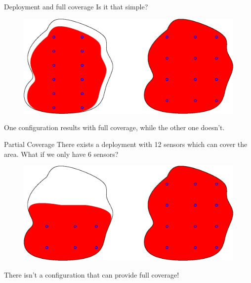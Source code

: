 \documentclass[t]{beamer}
\begin{document}
\begin{frame}[label=motivation7]{Deployment and full coverage}
Is it that simple?

\begin{figure}[b]
\includegraphics[scale=0.5]{motivation/deployment-configuration-partial-full-example.eps}
\end{figure}
One configuration results with full coverage, while the other one doesn't.
\end{frame}
\begin{frame}[label=motivation8]{Partial Coverage}
There exists a deployment with 12 sensors which can cover the area. What if we only have 6 sensors?

\begin{figure}[b]
\includegraphics[scale=0.5]{motivation/deployment-configuration-partial-no-enough-sensors.eps}
\end{figure}
There isn't a configuration that can provide full coverage!
\end{frame}
\end{document}
